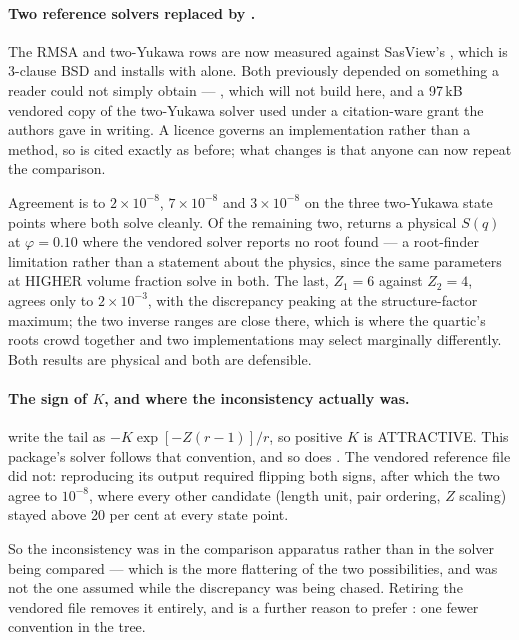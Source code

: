 \paragraph{Two reference solvers replaced by .} The RMSA
and two-Yukawa rows are now measured against SasView's ,
which is 3-clause BSD and installs with  alone. Both previously
depended on something a reader could not simply obtain --- ,
which will not build here, and a 97\,kB vendored copy of the two-Yukawa
solver used under a citation-ware grant the authors gave in writing. A
licence governs an implementation rather than a method, so \citet{Liu2005}
is cited exactly as before; what changes is that anyone can now repeat the
comparison.

Agreement is to $2\times10^{-8}$, $7\times10^{-8}$ and $3\times10^{-8}$ on
the three two-Yukawa state points where both solve cleanly. Of the
remaining two,  returns a physical $S(q)$ at
$\varphi = 0.10$ where the vendored solver reports no root found --- a
root-finder limitation rather than a statement about the physics, since the
same parameters at HIGHER volume fraction solve in both. The last,
$Z_1 = 6$ against $Z_2 = 4$, agrees only to $2\times10^{-3}$, with the
discrepancy peaking at the structure-factor maximum; the two inverse ranges
are close there, which is where the quartic's roots crowd together and two
implementations may select marginally differently. Both results are
physical and both are defensible.

\paragraph{The sign of $K$, and where the inconsistency actually was.}
\citet{Liu2005} write the tail as $-K\exp[-Z(r-1)]/r$, so positive $K$ is
ATTRACTIVE. This package's solver follows that convention, and so does
. The vendored reference file did not: reproducing its
output required flipping both signs, after which the two agree to
$10^{-8}$, where every other candidate (length unit, pair ordering, $Z$
scaling) stayed above 20 per cent at every state point.

So the inconsistency was in the comparison apparatus rather than in the
solver being compared --- which is the more flattering of the two
possibilities, and was not the one assumed while the discrepancy was being
chased. Retiring the vendored file removes it entirely, and is a further
reason to prefer : one fewer convention in the tree.

